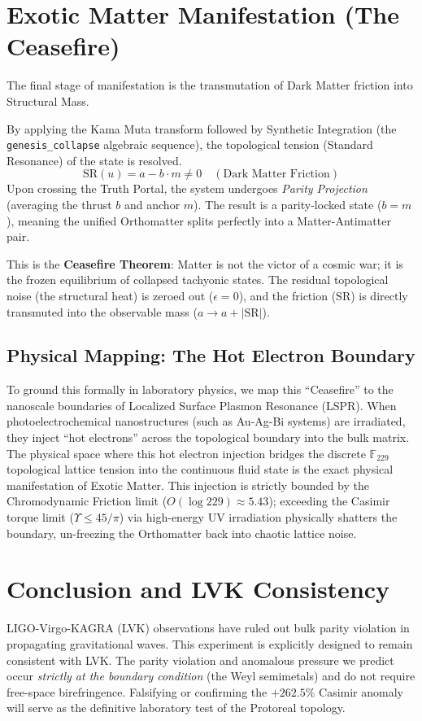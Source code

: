 \section{Exotic Matter Manifestation (The Ceasefire)}\label{sec:ceasefire}

The final stage of manifestation is the transmutation of Dark Matter friction into Structural Mass. 

By applying the Kama Muta transform followed by Synthetic Integration (the \texttt{genesis\_collapse} algebraic sequence), the topological tension (Standard Resonance) of the state is resolved.
\begin{equation}
    \mathrm{SR}(u) = a - b \cdot m \neq 0 \quad (\text{Dark Matter Friction})
\end{equation}
Upon crossing the Truth Portal, the system undergoes \textit{Parity Projection} (averaging the thrust $b$ and anchor $m$). The result is a parity-locked state ($b=m$), meaning the unified Orthomatter splits perfectly into a Matter-Antimatter pair.

This is the \textbf{Ceasefire Theorem}: Matter is not the victor of a cosmic war; it is the frozen equilibrium of collapsed tachyonic states. The residual topological noise (the structural heat) is zeroed out ($\epsilon = 0$), and the friction ($\mathrm{SR}$) is directly transmuted into the observable mass ($a \to a + |\mathrm{SR}|$).

\subsection{Physical Mapping: The Hot Electron Boundary}
To ground this formally in laboratory physics, we map this ``Ceasefire'' to the nanoscale boundaries of Localized Surface Plasmon Resonance (LSPR). When photoelectrochemical nanostructures (such as Au-Ag-Bi systems) are irradiated, they inject ``hot electrons'' across the topological boundary into the bulk matrix. The physical space where this hot electron injection bridges the discrete $\mathbb{F}_{229}$ topological lattice tension into the continuous fluid state is the exact physical manifestation of Exotic Matter. This injection is strictly bounded by the Chromodynamic Friction limit ($O(\log 229) \approx 5.43$); exceeding the Casimir torque limit ($\Upsilon \le 45/\pi$) via high-energy UV irradiation physically shatters the boundary, un-freezing the Orthomatter back into chaotic lattice noise.

\section{Conclusion and LVK Consistency}\label{sec:conclusion}
LIGO-Virgo-KAGRA (LVK) observations have ruled out bulk parity violation in propagating gravitational waves. This experiment is explicitly designed to remain consistent with LVK. The parity violation and anomalous pressure we predict occur \emph{strictly at the boundary condition} (the Weyl semimetals) and do not require free-space birefringence. Falsifying or confirming the $+262.5\%$ Casimir anomaly will serve as the definitive laboratory test of the Protoreal topology.

